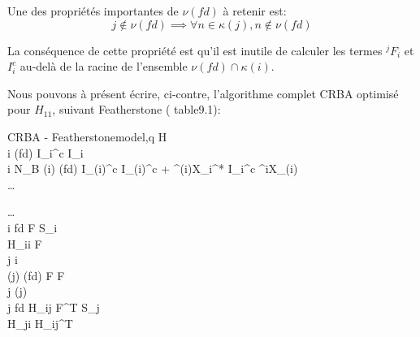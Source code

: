 \documentclass{report}
\begin{document}
\begin{flushleft}
Une des propriétés importantes de $\nu(fd)$ à retenir est:
\begin{equation*}
j \notin \nu(fd) \implies \forall n \in \kappa(j), n \notin \nu(fd)
\end{equation*}

La conséquence de cette propriété est qu'il est inutile de calculer les termes $^jF_i$ et $I_i^c$ au-delà de la racine de l'ensemble $\nu(fd) \cap \kappa(i)$.
\end{flushleft}

Nous pouvons à présent écrire, ci-contre, l'algorithme complet CRBA optimisé pour $H_{11}$, suivant Featherstone (\cite{bib_featherstone} table9.1):\\

\begin{minipage}[t]{\textwidth}
\setlength{\columnsep}{10pt}
\setlength{\columnseprule}{0.5pt}
\begin{multicols}{2}\raggedcolumns\small
    	\begin{spacing}{1.5}
		\begin{pseudocode}{CRBA - Featherstone}{model,q} \label{algo_crbaFeatherstoneH11}
    H  \\
		\FOREACH i \in \nu(fd) \DO
		  I_i^c \GETS I_i \\
		\FOR i \GETS N_B  \DO
		\BEGIN
		  \IF \lambda(i) \in \nu(fd)
		  \THEN
		    I_{\lambda(i)}^c \GETS I_{\lambda(i)}^c + {^{\lambda(i)}X_i^*} \: {I_i^c} \: {^iX_{\lambda(i)}} \\
		  \ldots
		\END
	  \end{pseudocode}
	  
	  \begin{pseudocode}[display]{}{}
	  \DO
    \BEGIN
      \ldots \\
		  \IF i \in fd \THEN
		  \BEGIN
			  F  \: S_i \\
			  H_{ii}  F \\
			  j \GETS i \\
			  \WHILE \lambda(j) \in \nu(fd) \DO
			  \BEGIN
			    F  F \\
			    j \GETS \lambda(j) \\
			    \IF j \in fd \THEN
			    \BEGIN
				    H_{ij} \GETS F^T S_j \\
				    H_{ji} \GETS H_{ij}^T
			    \END
			  \END
			\END
		\END
	  \end{pseudocode}
	  \end{spacing}
\end{multicols}
\end{minipage} \vspace{0.3cm} \\
\end{document}
